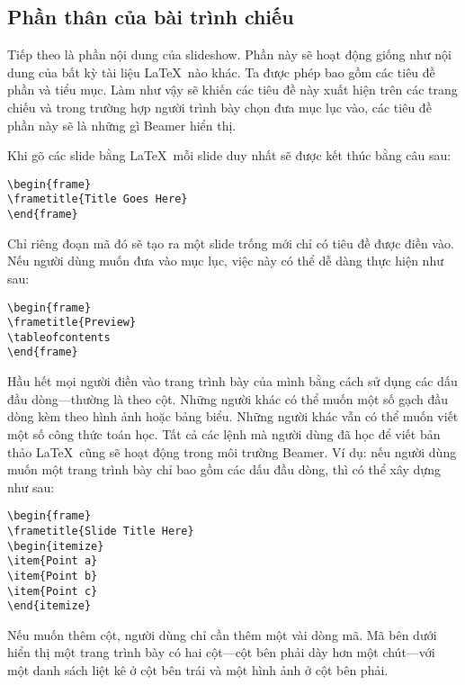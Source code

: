 \documentclass[a4paper,UKenglish,cleveref, autoref, thm-restate]{lipics-v2021}
\begin{document}
\subsection{Phần thân của bài trình chiếu}

Tiếp theo là phần nội dung của slideshow. Phần này sẽ hoạt động giống như nội dung của bất kỳ tài liệu \LaTeX\ nào khác. Ta được phép bao gồm các tiêu đề phần và tiểu mục. Làm như vậy sẽ khiến các tiêu đề này xuất hiện trên các trang chiếu và trong trường hợp người trình bày chọn đưa mục lục vào, các tiêu đề phần này sẽ là những gì Beamer hiển thị.

Khi gõ các slide bằng \LaTeX\, mỗi slide duy nhất sẽ được kết thúc bằng câu sau:
\begin{lstlisting}
\begin{frame}
\frametitle{Title Goes Here}
\end{frame}
\end{lstlisting}

Chỉ riêng đoạn mã đó sẽ tạo ra một slide trống mới chỉ có tiêu đề được điền vào. Nếu người dùng muốn đưa vào mục lục, việc này có thể dễ dàng thực hiện như sau:

\begin{lstlisting}
\begin{frame}
\frametitle{Preview}
\tableofcontents
\end{frame}
\end{lstlisting}

Hầu hết mọi người điền vào trang trình bày của mình bằng cách sử dụng các dấu đầu dòng—thường là theo cột. Những người khác có thể muốn một số gạch đầu dòng kèm theo hình ảnh hoặc bảng biểu. Những người khác vẫn có thể muốn viết một số công thức toán học. Tất cả các lệnh mà người dùng đã học để viết bản thảo \LaTeX\ cũng sẽ hoạt động trong môi trường Beamer. Ví dụ: nếu người dùng muốn một trang trình bày chỉ bao gồm các dấu đầu dòng, thì có thể xây dựng như sau:

\begin{lstlisting}
\begin{frame}
\frametitle{Slide Title Here}
\begin{itemize}
\item{Point a}
\item{Point b}
\item{Point c}
\end{itemize}
\end{lstlisting}

Nếu muốn thêm cột, người dùng chỉ cần thêm một vài dòng mã. Mã bên dưới hiển thị một trang trình bày có hai cột—cột bên phải dày hơn một chút—với một danh sách liệt kê ở cột bên trái và một hình ảnh ở cột bên phải.
\end{document}

